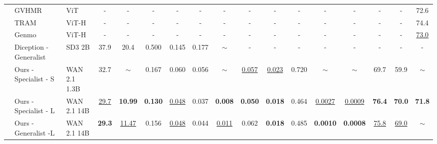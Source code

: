 \documentclass[11pt, a4paper, logo, onecolumn]{googledeepmind}
\begin{document}
\begin{table}[t]
{\begin{tabular}{@{}ll l cc cc ccc cc cccc c@{}}
\midrule

& GVHMR~\cite{shen2024gvhmr} & ViT & - & - & - & - & - & - & - & - & - & - & - & - & - & 72.6 \\
& TRAM~\cite{wang2024tram} & ViT-H & - & - & - & - & - & - & - & - & - & - & - & - & - & 74.4 \\
& Genmo~\cite{genmo2025} & ViT-H & - & - & - & - & - & - & - & - & - & - & - & - & - & \underline{73.0} \\
\midrule
& Diception - Generalist~\cite{zhao2025diception}  & SD3 2B & 37.9 & 20.4 & 0.500 & 0.145 & 0.177 & $\sim$ & - & - & - & - & - & - & - & -  \\

\midrule
& Ours - Specialist - S & WAN 2.1 1.3B & 32.7 & $\sim$ & 0.167 & 0.060 & 0.056 & $\sim$ & \underline{0.057} & \underline{0.023} & 0.720 & $\sim$ & $\sim$ & 69.7 & 59.9 & $\sim$ \\

& Ours - Specialist - L & WAN 2.1 14B & \underline{29.7} & \textbf{10.99} & \textbf{0.130} & \underline{0.048} & {0.037} & \textbf{0.008} & \textbf{0.050} & \textbf{0.018} & 0.464 & \underline{0.0027} & \underline{0.0009} & \textbf{76.4} & \textbf{70.0} & \textbf{71.8} \\



& Ours - Generalist -L & WAN 2.1 14B & \textbf{29.3} & \underline{11.47} & {0.156} & \underline{0.048} & {0.044} & \underline{0.011} & {0.062} & \textbf{0.018} & 0.485 & \textbf{0.0010} & \textbf{0.0008} & \underline{75.8} & \underline{69.0} & $\sim$ \\





\bottomrule
\end{tabular}
}
\label{tab:result_summary}
\end{table}
\end{document}
